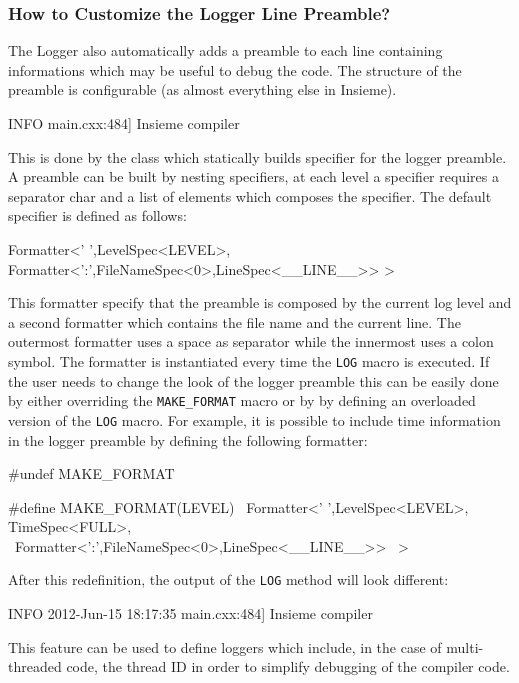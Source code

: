 \subsubsection{How to Customize the Logger Line Preamble?}

The Logger also automatically adds a preamble to each line containing
informations which may be useful to debug the code. The structure of the
preamble is configurable (as almost everything else in Insieme). 

\begin{srcCode}
INFO  main.cxx:484] Insieme compiler
\end{srcCode}

This is done by the  class which statically builds
specifier for the logger preamble. A preamble can be built by nesting
specifiers, at each level a specifier requires a separator char and a list of
elements which composes the specifier. The default specifier is defined as
follows:

\begin{srcCode}
Formatter<' ',LevelSpec<LEVEL>,
	Formatter<':',FileNameSpec<0>,LineSpec<__LINE__>>
>
\end{srcCode}

This formatter specify that the preamble is composed by the current log level
and a second formatter which contains the file name and the current line. The
outermost formatter uses a space as separator while the innermost uses a colon
symbol. The formatter is instantiated every time the {\tt LOG} macro is
executed. If the user needs to change the look of the logger preamble this can
be easily done by either overriding the {\tt MAKE\_FORMAT} macro or by by
defining an overloaded version of the {\tt LOG} macro. For example, it is
possible to include time information in the logger preamble by defining the
following formatter:

\begin{srcCode}
#undef MAKE_FORMAT

#define MAKE_FORMAT(LEVEL) \
Formatter<' ',LevelSpec<LEVEL>, TimeSpec<FULL>, \
	Formatter<':',FileNameSpec<0>,LineSpec<__LINE__>> \
>
\end{srcCode}

After this redefinition, the output of the {\tt LOG} method will look different:
\begin{srcCode}
INFO  2012-Jun-15 18:17:35 main.cxx:484] Insieme compiler
\end{srcCode}

This feature can be used to define loggers which include, in the case of
multi-threaded code, the thread ID in order to simplify debugging of the
compiler code. 


